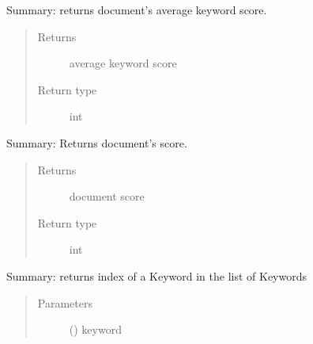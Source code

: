 \documentclass[letterpaper,10pt,english]{sphinxmanual}
\begin{document}
\begin{fulllineitems}
\begin{fulllineitems}
\end{fulllineitems}


\begin{fulllineitems}
\label{\detokenize{KeywordList:KeywordList.KeywordList.getavgkeywordscore}}
Summary: returns document’s average keyword score.
\begin{quote}\begin{description}
\item[{Returns}] \leavevmode
average keyword score

\item[{Return type}] \leavevmode
int

\end{description}\end{quote}

\end{fulllineitems}


\begin{fulllineitems}
\label{\detokenize{KeywordList:KeywordList.KeywordList.getdocumentscore}}
Summary: Returns document’s score.
\begin{quote}\begin{description}
\item[{Returns}] \leavevmode
document score

\item[{Return type}] \leavevmode
int

\end{description}\end{quote}

\end{fulllineitems}


\begin{fulllineitems}
\label{\detokenize{KeywordList:KeywordList.KeywordList.getindexofword}}
Summary: returns index of a Keyword in the list of Keywords
\begin{quote}\begin{description}
\item[{Parameters}] \leavevmode
{} () \textendash{} keyword


\end{description}
\end{quote}
\end{fulllineitems}
\end{fulllineitems}
\end{document}
